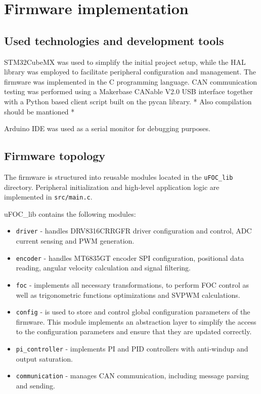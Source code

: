 \chapter{Firmware implementation}
\section{Used technologies and development tools}
STM32CubeMX was used to simplify the initial project setup, while the HAL library was employed to facilitate peripheral configuration
and management. The firmware was implemented in the C programming language. CAN communication testing was performed using a 
Makerbase CANable V2.0 USB interface together with a Python based client script built on the pycan library. 
* Also compilation should be mantioned * 

Arduino IDE was used as a serial monitor for debugging purposes.
\section{Firmware topology}
The firmware is structured into reusable modules located in the \texttt{uFOC\_lib} directory. 
Peripheral initialization and high-level application logic are implemented in \texttt{src/main.c}.

uFOC\_lib contains the following modules:
\begin{itemize}
    \item \texttt{driver} - handles DRV8316CRRGFR driver configuration and control, ADC current sensing and PWM generation.
    \item \texttt{encoder} - handles MT6835GT encoder SPI configuration, positional data reading, 
                            angular velocity calculation and signal filtering.
    \item \texttt{foc} - implements all necessary transformations, to perform FOC control as well as 
                            trigonometric functions optimizations and SVPWM calculations.
    \item \texttt{config} - is used to store and control global configuration parameters of the firmware. 
                            This module implements an abstraction layer to simplify the access 
                            to the configuration parameters and ensure that they are updated correctly.
    \item \texttt{pi\_controller} - implements PI and PID controllers with anti-windup and output saturation.
    \item \texttt{communication} - manages CAN communication, including message parsing and sending.
\end{itemize}

